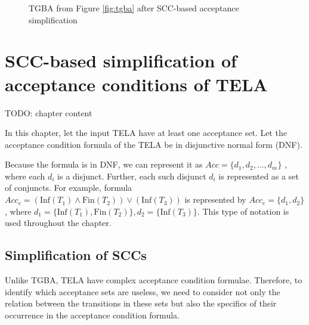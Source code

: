 \documentclass[
  digital, %
  twoside, %
  table,   %
  lof,     %
  lot,     %
]{fithesis3}
\begin{document}
\begin{figure}[h]
    \begin{center}
    \caption{TGBA from Figure \ref{fig:tgba} after SCC-based acceptance simplification}
    \label{fig:simpl_tgba}
  \end{center}
\end{figure}


\chapter{SCC-based simplification of acceptance conditions of TELA}
\label{chap:simpl_tela}
TODO: chapter content

In this chapter, let the input TELA have at least one acceptance set. Let the acceptance condition formula of the TELA be in disjunctive normal form (DNF). 

Because the formula is in DNF, we can represent it as $Acc = \{d_1, d_2, \dots, d_m\}$ , where each $d_i$ is a disjunct. Further, each such disjunct $d_i$ is represented as a set of conjuncts. For example, formula $Acc_e = (\text{Inf}(T_1) \wedge \text{Fin}(T_2)) \vee (\text{Inf}(T_3))$ is represented by $Acc_e = \{d_1, d_2\}$, where $d_1 = \{\text{Inf}(T_1), \text{Fin}(T_2)\}, d_2 = \{\text{Inf}(T_3)\}$. This type of notation is used throughout the chapter.

\section{Simplification of SCCs}
Unlike TGBA, TELA have complex acceptance condition formulae. Therefore, to identify which acceptance sets are useless, we need to consider not only the relation between the transitions in these sets but also the specifics of their occurrence in the acceptance condition formula. 
\end{document}
